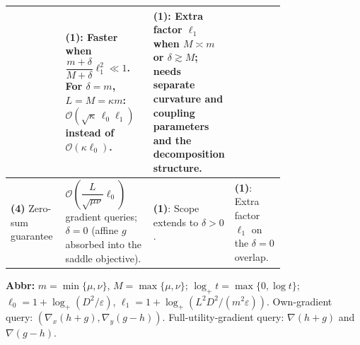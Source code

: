 \begin{table}[tp]
\begin{threeparttable}
\begin{tabularx}{\linewidth}{@{}>{\raggedright\arraybackslash}p{0.20\linewidth}>{\raggedright\arraybackslash}p{0.32\linewidth}>{\raggedright\arraybackslash}p{0.25\linewidth}>{\raggedright\arraybackslash}X@{}}
& \textbf{(1)}: Faster when $\dfrac{m+\delta}{M+\delta}\ell_1^2\ll1$. For $\delta=m$, $L=M=\kappa m$: $\mathcal{O}(\sqrt\kappa\,\ell_0\ell_1)$ instead of $\mathcal{O}(\kappa\ell_0)$.
& \textbf{(1)}: Extra factor $\ell_1$ when $M\asymp m$ or $\delta\gtrsim M$; needs separate curvature and coupling parameters and the decomposition structure.
\\
\midrule
\textbf{(4)} Zero-sum guarantee \citep[Prop.~2]{nzsLuo2025v1}
& $\mathcal{O}\!\left(\dfrac{L}{\sqrt{\mu\nu}}\ell_0\right)$ gradient queries; $\delta=0$ (affine $g$ absorbed into the saddle objective).
& \textbf{(1)}: Scope extends to $\delta>0$.
& \textbf{(1)}: Extra factor $\ell_1$ on the $\delta=0$ overlap.
\\
\bottomrule
\end{tabularx}
\begin{tablenotes}[flushleft]\footnotesize
\item[] \textbf{Abbr:} $m=\min\{\mu,\nu\}$, $M=\max\{\mu,\nu\}$; $\log_+ t=\max\{0,\log t\}$; $\ell_0=1+\log_+(D^2/\varepsilon)$, $\ell_1=1+\log_+(L^2D^2/(m^2\varepsilon))$. Own-gradient query: $(\nabla_x(h+g),\nabla_y(g-h))$. Full-utility-gradient query: $\nabla(h+g)$ and $\nabla(g-h)$.
\end{tablenotes}
\end{threeparttable}
\end{table}
\clearpage
